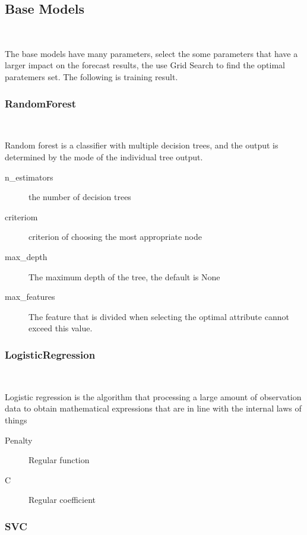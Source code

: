 \subsection{Base Models}
\

The base models have many parameters,
select the some parameters that 
have a larger impact on 
the forecast results,
the use Grid Search to find 
the optimal paratemers set.	
The following is training result. 
\subsubsection{RandomForest}
\

Random forest is a classifier with 
multiple decision trees, and
the output is determined by 
the mode of the individual tree output.


\begin{description}
	\item[n_estimators] the number of decision trees
	\item[criteriom] criterion of choosing 
	the most appropriate node
	\item[max_depth] The maximum depth of the tree, 
	the default is None 
	\item[max_features] The feature that is divided 
	when selecting the optimal attribute 
	cannot exceed this value.
\end{description}




\subsubsection{LogisticRegression}
\

Logistic regression is the algorithm that 
processing a large amount of 
observation data to 
obtain mathematical expressions 
that are in line with 
the internal laws of things
	
	
\begin{description}
	\item[Penalty] Regular function
	\item[C] Regular coefficient
\end{description}
	


\subsubsection{SVC}
\

